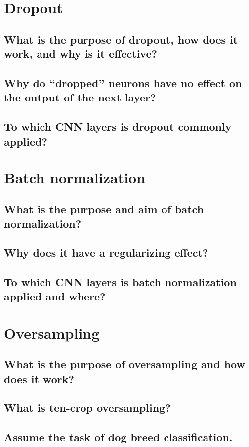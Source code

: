 \section{Dropout}
\subsection{What is the purpose of dropout, how does it work, and why is it effective?}
\subsection{Why do ``dropped'' neurons have no effect on the output of the next layer?}
\subsection{To which CNN layers is dropout commonly applied?}

\section{Batch normalization}
\subsection{What is the purpose and aim of batch normalization?}
\subsection{Why does it have a regularizing effect?}
\subsection{To which CNN layers is batch normalization applied and where?}

\section{Oversampling}
\subsection{What is the purpose of oversampling and how does it work?}
\subsection{What is ten-crop oversampling?}
\subsection{Assume the task of dog breed classification.}
